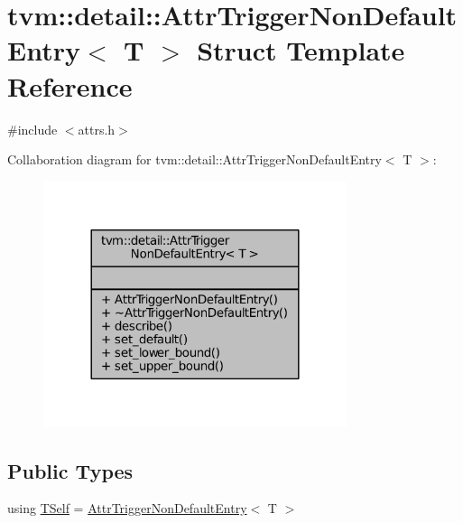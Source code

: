 \hypertarget{structtvm_1_1detail_1_1AttrTriggerNonDefaultEntry}{}\section{tvm\+:\+:detail\+:\+:Attr\+Trigger\+Non\+Default\+Entry$<$ T $>$ Struct Template Reference}
\label{structtvm_1_1detail_1_1AttrTriggerNonDefaultEntry}


{\ttfamily \#include $<$attrs.\+h$>$}



Collaboration diagram for tvm\+:\+:detail\+:\+:Attr\+Trigger\+Non\+Default\+Entry$<$ T $>$\+:
\nopagebreak
\begin{figure}[H]
\begin{center}
\leavevmode
\includegraphics[width=252pt]{structtvm_1_1detail_1_1AttrTriggerNonDefaultEntry__coll__graph}
\end{center}
\end{figure}
\subsection*{Public Types}
\begin{DoxyCompactItemize}
\item 
using \hyperlink{structtvm_1_1detail_1_1AttrTriggerNonDefaultEntry_ac7176780304bdf87b523bcae079e17ee}{T\+Self} = \hyperlink{structtvm_1_1detail_1_1AttrTriggerNonDefaultEntry}{Attr\+Trigger\+Non\+Default\+Entry}$<$ T $>$
\end{DoxyCompactItemize}
